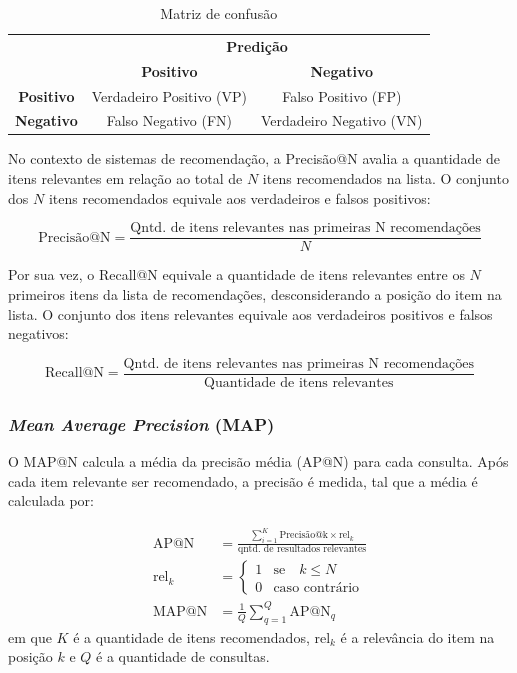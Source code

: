   \begin{table}[H]
    \centering
    \begin{tabular}{c|c|c|}
      \cline{2-3}
      & \multicolumn{2}{c|}{\textbf{Predição}} \\ \cline{2-3} 
      & \textbf{Positivo} & \textbf{Negativo} \\ \hline
      \multicolumn{1}{|c|}{\textbf{Positivo}} & Verdadeiro Positivo (VP) & Falso Positivo (FP) \\ \hline
      \multicolumn{1}{|c|}{\textbf{Negativo}} & Falso Negativo (FN) & Verdadeiro Negativo (VN) \\ \hline
    \end{tabular}
    \caption{Matriz de confusão}
    \label{tab:confusion_matrix}
  \end{table}

  No contexto de sistemas de recomendação, a Precisão@N avalia a quantidade de
  itens relevantes em relação ao total de $N$ itens recomendados na lista. O conjunto
  dos $N$ itens recomendados equivale aos verdadeiros e falsos positivos:

  \begin{equation}
    \text{Precisão@N} = \frac{\text{Qntd. de itens relevantes nas primeiras N recomendações}}{N}
  \end{equation}

  Por sua vez, o Recall@N equivale a quantidade de itens relevantes entre
  os $N$ primeiros itens da lista de recomendações, desconsiderando a
  posição do item na lista. O conjunto dos itens relevantes equivale
  aos verdadeiros positivos e falsos negativos:

  \begin{equation}
    \text{Recall@N} = \frac{\text{Qntd. de itens relevantes nas primeiras N recomendações}}{\text{Quantidade de itens relevantes}}
  \end{equation}

  \subsubsection{\textit{Mean Average Precision} (MAP)} O MAP@N calcula a média
  da precisão média (AP@N) para cada consulta. Após cada item relevante ser
  recomendado, a precisão é medida, tal que a média é calculada por:

  \begin{align}
    \text{AP@N} &= \frac{\sum_{i = 1}^{K}\text{Precisão@k} \times \text{rel}_{k}}{\text{qntd. de resultados relevantes}} \\
    \text{rel}_k &= \begin{cases}
      1 & \text{se} \quad k \leq N \\
      0 & \text{caso contrário} 
    \end{cases} \\
    \text{MAP@N} &= \frac{1}{Q}\sum_{q = 1}^{Q} \text{AP@N}_{q}
  \end{align}
  em que $K$ é a quantidade de itens recomendados, $\text{rel}_{k}$ é a
  relevância do item na posição $k$ e $Q$ é a quantidade de consultas.

